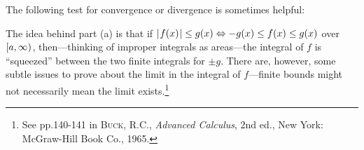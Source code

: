 \newpage
The following test for convergence or divergence is sometimes helpful:


The idea behind part (a) is that if $\lvert\mspace{1mu}f(x)\mspace{1mu}\rvert \le g(x) \Leftrightarrow -g(x) \le f(x) \le g(x)$ over
$\lbrack a,\infty )$, then---thinking of improper integrals as areas---the
integral of $f$ is ``squeezed'' between the two finite integrals for $\pm g$.
There are, however, some subtle issues to prove about the limit in the integral
of $f$---finite bounds might not necessarily mean the limit exists.\footnote{See
pp.140-141 in \textsc{Buck, R.C.}, \emph{Advanced Calculus}, 2nd ed., New York:
McGraw-Hill Book Co., 1965.}

